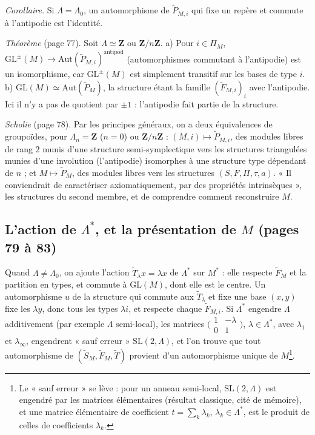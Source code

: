 \documentclass[11pt,a4paper]{article}
\begin{document}
\emph{Corollaire.} Si $\Lambda = \Lambda_0$, un automorphisme de
$\widetilde{P}_{M,i}$ qui fixe un repère et commute à l'antipodie est
l'identité.

\emph{Théorème} (page 77). Soit $\Lambda \simeq \mathbf{Z}$ ou
$\mathbf{Z}/n\mathbf{Z}$. a) Pour $i \in \Pi_M$, $\mathrm{GL}^{\pm}(M) \to
\mathrm{Aut}(\widetilde{P}_{M,i})^{\mathrm{antipod}}$ (automorphismes commutant
à l'antipodie) est un isomorphisme, car $\mathrm{GL}^{\pm}(M)$ est simplement
transitif sur les bases de type $i$. b) $\mathrm{GL}(M) \simeq
\mathrm{Aut}(\widetilde{P}_M)$, la structure étant la famille
$(\widetilde{F}_{M,i})_i$ avec l'antipodie. Ici il n'y a pas de quotient par
$\pm 1$ : l'antipodie fait partie de la structure.

\emph{Scholie} (page 78). Par les principes généraux, on a deux équivalences
de groupoïdes, pour $\Lambda_n = \mathbf{Z}$ ($n = 0$) ou
$\mathbf{Z}/n\mathbf{Z}$ : $(M, i) \mapsto \widetilde{P}_{M,i}$, des modules
libres de rang $2$ munis d'une structure semi-symplectique vers les structures
triangulées munies d'une involution (l'antipodie) isomorphes à une structure
type dépendant de $n$ ; et $M \mapsto \widetilde{P}_M$, des modules libres
vers les structures $(S, F, \Pi, \tau, a)$. « Il conviendrait de caractériser
axiomatiquement, par des propriétés intrinsèques », les structures du second
membre, et de comprendre comment reconstruire $M$.

\subsection*{L'action de $\Lambda^{*}$, et la présentation de $M$ (pages 79 à 83)}

Quand $\Lambda \neq \Lambda_0$, on ajoute l'action $\widetilde{T}_\lambda x =
\lambda x$ de $\Lambda^{*}$ sur $M^{*}$ : elle respecte $\widetilde{F}_M$ et la
partition en types, et commute à $\mathrm{GL}(M)$, dont elle est le centre. Un
automorphisme $u$ de la structure qui commute aux $\widetilde{T}_\lambda$ et
fixe une base $(x, y)$ fixe les $\lambda y$, donc tous les types $\lambda i$, et
respecte chaque $\widetilde{F}_{M,i}$. Si $\Lambda^{*}$ engendre $\Lambda$
additivement (par exemple $\Lambda$ semi-local), les matrices
$\bigl(\begin{smallmatrix} 1 & -\lambda \\ 0 & 1 \end{smallmatrix}\bigr)$,
$\lambda \in \Lambda^{*}$, avec $\lambda_1$ et $\lambda_\infty$, engendrent
« sauf erreur » $\mathrm{SL}(2, \Lambda)$, et l'on trouve que tout automorphisme
de $(\widetilde{S}_M, \widetilde{F}_M, \widetilde{T})$ provient d'un
automorphisme unique de $M$\footnote{Le « sauf erreur » se lève : pour un
anneau semi-local, $\mathrm{SL}(2, \Lambda)$ est engendré par les matrices
élémentaires (résultat classique, cité de mémoire), et une matrice élémentaire
de coefficient $t = \sum_k \lambda_k$, $\lambda_k \in \Lambda^{*}$, est le
produit de celles de coefficients $\lambda_k$.}.
\end{document}
